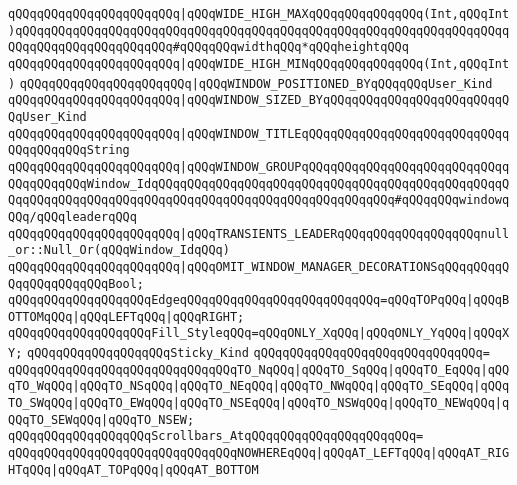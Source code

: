 \newline
\verb|qQQqqQQqqQQqqQQqqQQqqQQq|\verb#|qQQqWIDE_HIGH_MAXqQQqqQQqqQQqqQQq(Int,qQQqInt)qQQqqQQqqQQqqQQqqQQqqQQqqQQqqQQqqQQqqQQqqQQqqQQqqQQqqQQqqQQqqQQqqQQqqQQqqQQqqQQqqQQqqQQqqQQq#\verb|#qQQqqQQqwidthqQQq*qQQqheightqQQq|\newline
\verb|qQQqqQQqqQQqqQQqqQQqqQQq|\verb#|qQQqWIDE_HIGH_MINqQQqqQQqqQQqqQQq(Int,qQQqInt)#\newline
\verb|qQQqqQQqqQQqqQQqqQQqqQQq|\verb#|qQQqWINDOW_POSITIONED_BYqQQqqQQqUser_Kind#\newline
\verb|qQQqqQQqqQQqqQQqqQQqqQQq|\verb#|qQQqWINDOW_SIZED_BYqQQqqQQqqQQqqQQqqQQqqQQqqQQqUser_Kind#\newline
\verb|qQQqqQQqqQQqqQQqqQQqqQQq|\verb#|qQQqWINDOW_TITLEqQQqqQQqqQQqqQQqqQQqqQQqqQQqqQQqqQQqqQQqString#\newline
\verb|qQQqqQQqqQQqqQQqqQQqqQQq|\verb#|qQQqWINDOW_GROUPqQQqqQQqqQQqqQQqqQQqqQQqqQQqqQQqqQQqqQQqWindow_IdqQQqqQQqqQQqqQQqqQQqqQQqqQQqqQQqqQQqqQQqqQQqqQQqqQQqqQQqqQQqqQQqqQQqqQQqqQQqqQQqqQQqqQQqqQQqqQQqqQQqqQQq#\verb|#qQQqqQQqwindowqQQq/qQQqleaderqQQq|\newline
\verb|qQQqqQQqqQQqqQQqqQQqqQQq|\verb#|qQQqTRANSIENTS_LEADERqQQqqQQqqQQqqQQqqQQqnull_or::Null_Or(qQQqWindow_IdqQQq)#\newline
\verb|qQQqqQQqqQQqqQQqqQQqqQQq|\verb#|qQQqOMIT_WINDOW_MANAGER_DECORATIONSqQQqqQQqqQQqqQQqqQQqqQQqBool;#\newline
\newline
\verb|qQQqqQQqqQQqqQQqqQQqEdgeqQQqqQQqqQQqqQQqqQQqqQQqqQQq=qQQqTOPqQQq|\verb#|qQQqBOTTOMqQQq|qQQqLEFTqQQq|qQQqRIGHT;#\newline
\newline
\verb|qQQqqQQqqQQqqQQqqQQqFill_StyleqQQq=qQQqONLY_XqQQq|\verb#|qQQqONLY_YqQQq|qQQqXY;#\newline
\newline
\verb|qQQqqQQqqQQqqQQqqQQqSticky_Kind|\newline
\verb|qQQqqQQqqQQqqQQqqQQqqQQqqQQqqQQq=|\newline
\verb|qQQqqQQqqQQqqQQqqQQqqQQqqQQqqQQqTO_NqQQq|\verb#|qQQqTO_SqQQq|qQQqTO_EqQQq|qQQqTO_WqQQq|qQQqTO_NSqQQq|qQQqTO_NEqQQq|qQQqTO_NWqQQq|qQQqTO_SEqQQq|qQQqTO_SWqQQq|qQQqTO_EWqQQq|qQQqTO_NSEqQQq|qQQqTO_NSWqQQq|qQQqTO_NEWqQQq|qQQqTO_SEWqQQq|qQQqTO_NSEW;#\newline
\newline
\verb|qQQqqQQqqQQqqQQqqQQqScrollbars_AtqQQqqQQqqQQqqQQqqQQqqQQq=|\newline
\verb|qQQqqQQqqQQqqQQqqQQqqQQqqQQqqQQqNOWHEREqQQq|\verb#|qQQqAT_LEFTqQQq|qQQqAT_RIGHTqQQq|qQQqAT_TOPqQQq|qQQqAT_BOTTOM#\newline
